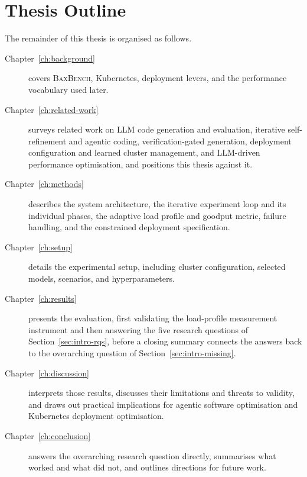 \section{Thesis Outline}
\label{sec:intro-outline}

The remainder of this thesis is organised as follows.
%
\begin{description}
  \item[Chapter~\ref{ch:background}] covers \textsc{BaxBench}, Kubernetes,
    deployment levers, and the performance vocabulary used later.

  \item[Chapter~\ref{ch:related-work}] surveys related work on LLM code
    generation and evaluation, iterative self-refinement and agentic coding,
    verification-gated generation, deployment configuration and learned
    cluster management, and LLM-driven performance optimisation, and
    positions this thesis against it.

  \item[Chapter~\ref{ch:methods}] describes the system architecture, the
    iterative experiment loop and its individual phases, the adaptive load
    profile and goodput metric, failure handling, and the constrained
    deployment specification.

  \item[Chapter~\ref{ch:setup}] details the experimental setup, including
    cluster configuration, selected models, scenarios, and hyperparameters.

  \item[Chapter~\ref{ch:results}] presents the evaluation, first validating the
    load-profile measurement instrument and then answering the five research
    questions of Section~\ref{sec:intro-rqs}, before a closing summary
    connects the answers back to the overarching question of
    Section~\ref{sec:intro-missing}.

  \item[Chapter~\ref{ch:discussion}] interprets those results, discusses their
    limitations and threats to validity, and draws out practical implications
    for agentic software optimisation and Kubernetes deployment optimisation.

  \item[Chapter~\ref{ch:conclusion}] answers the overarching research question
    directly, summarises what worked and what did not, and outlines
    directions for future work.
\end{description}
